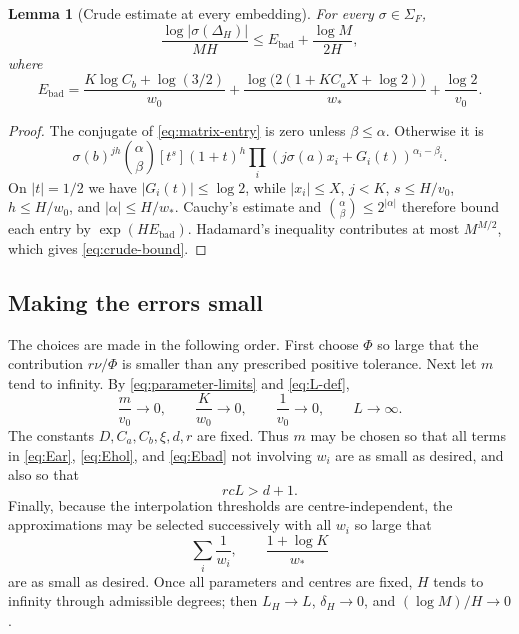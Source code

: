 \documentclass[11pt]{article}
\newtheorem{lemma}[theorem]{Lemma}
\theoremstyle{definition}
\theoremstyle{remark}
\numberwithin{equation}{section}
\begin{document}
\begin{lemma}[Crude estimate at every embedding]\label{lem:crude}
For every $\sigma\in\Sigma_F$,
\begin{equation}\label{eq:crude-bound}
 \frac{\log|\sigma(\Delta_H)|}{MH}
 \le E_{\mathrm{bad}}+\frac{\log M}{2H},
\end{equation}
where
\begin{equation}\label{eq:Ebad}
 E_{\mathrm{bad}}
 =\frac{K\log C_b+\log(3/2)}{w_0}
 +\frac{\log\bigl(2(1+KC_aX+\log2)\bigr)}{w_*}
 +\frac{\log2}{v_0}.
\end{equation}
\end{lemma}

\begin{proof}
The conjugate of \eqref{eq:matrix-entry} is zero unless
$\beta\le\alpha$.  Otherwise it is
\[
 \sigma(b)^{jh}\binom\alpha\beta[t^s](1+t)^h
 \prod_i(j\sigma(a)x_i+G_i(t))^{\alpha_i-\beta_i}.
\]
On $|t|=1/2$ we have $|G_i(t)|\le\log2$, while
$|x_i|\le X$, $j<K$, $s\le H/v_0$, $h\le H/w_0$, and
$|\alpha|\le H/w_*$.  Cauchy's estimate and
$\binom\alpha\beta\le2^{|\alpha|}$ therefore bound each entry by
$\exp(HE_{\mathrm{bad}})$.  Hadamard's inequality contributes at most
$M^{M/2}$, which gives \eqref{eq:crude-bound}.
\end{proof}

\subsection{Making the errors small}

The choices are made in the following order.  First choose $\Phi$ so
large that the contribution $r\nu/\Phi$ is smaller than any prescribed
positive tolerance.  Next let $m$ tend to infinity.  By
\eqref{eq:parameter-limits} and \eqref{eq:L-def},
\[
 \frac{m}{v_0}\to0,
 \qquad \frac K{w_0}\to0,
 \qquad \frac1{v_0}\to0,
 \qquad L\to\infty.
\]
The constants $D,C_a,C_b,\xi,d,r$ are fixed.  Thus $m$ may be chosen so
that all terms in \eqref{eq:Ear}, \eqref{eq:Ehol}, and
\eqref{eq:Ebad} not involving $w_i$ are as small as desired, and also
so that
\begin{equation}\label{eq:low-gap}
 rcL>d+1.
\end{equation}
Finally, because the interpolation thresholds are centre-independent,
the approximations may be selected successively with all $w_i$ so
large that
\[
 \sum_i\frac1{w_i},\qquad \frac{1+\log K}{w_*}
\]
are as small as desired.  Once all parameters and centres are fixed,
$H$ tends to infinity through admissible degrees; then
$L_H\to L$, $\delta_H\to0$, and $(\log M)/H\to0$.
\end{document}
